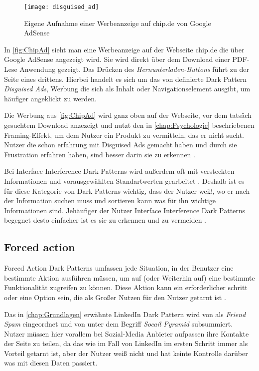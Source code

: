 \documentclass[conference,compsoc,final,a4paper]{IEEEtran}
\begin{document}
\begin{figure}[!ht]
  \centering
  \texttt{[image: disguised\_ad]}
  \caption{Eigene Aufnahme einer Werbeanzeige auf chip.de von Google AdSense~\autocite{ChipAd}}
  \label{fig:ChipAd}
\end{figure}

In \autoref{fig:ChipAd} sieht man eine Werbeanzeige auf der Webseite chip.de die über Google AdSense angezeigt wird. Sie wird direkt über dem Download einer PDF-Lese Anwendung gezeigt. Das Drücken des \textit{Hernunterladen-Buttons} führt zu der Seite eines drittens. Hierbei handelt es sich um das von \citeauthor{Brignull} \autocite{Brignull} definierte Dark Pattern \textit{Disguised Ads}, Werbung die sich als Inhalt oder Navigationselement ausgibt, um häufiger angeklickt zu werden.

Die Werbung aus \autoref{fig:ChipAd} wird ganz oben auf der Webseite, vor dem tatsäch gesuchtem Download anzezeigt und nutzt den in \autoref{chap:Psychologie} beschriebenen Framing-Effekt, um dem Nutzer ein Produkt zu vermitteln, das er nicht sucht. Nutzer die schon erfahrung mit Disguised Ads gemacht haben und durch sie Frustration erfahren haben, sind besser darin sie zu erkennen \autocite{M.Bhoot2020}.

Bei Interface Interference Dark Patterns wird außerdem oft mit versteckten Informationen und vorausgewählten Standartwerten gearbeitet \autocite{Gray_2018}. Deshalb ist es für diese Kategorie von Dark Patterns wichtig, dass der Nutzer weiß, wo er nach der Information suchen muss und sortieren kann was für ihn wichtige Informationen sind. Jehäufiger der Nutzer Interface Interference Dark Patterns begegnet desto einfacher ist es sie zu erkennen und zu vermeiden \autocite{M.Bhoot2020}.

\subsection{Forced action}
Forced Action Dark Patterns umfassen jede Situation, in der Benutzer eine bestimmte Aktion ausführen müssen, um auf (oder Weiterhin auf) eine bestimmte Funktionalität zugreifen zu können. Diese Aktion kann ein erforderlicher schritt oder eine Option sein, die als Großer Nutzen für den Nutzer getarnt ist \autocite{Gray_2018}.

Das in \autoref{chap:Grundlagen} erwähnte LinkedIn Dark Pattern wird von \citeauthor{Brignull} \autocite{Brignull} als \textit{Friend Spam} eingeordnet und von \citeauthor*{Gray_2018} \autocite{Gray_2018} unter dem Begriff \textit{Socail Pyramid} subsummiert. Nutzer müssen hier vorallem bei Sozial-Media Anbieter aufpassen ihre Kontakte der Seite zu teilen, da das wie im Fall von LinkedIn im ersten Schritt immer als Vorteil getarnt ist, aber der Nutzer weiß nicht und hat keinte Kontrolle darüber was mit diesen Daten passiert.
\end{document}
